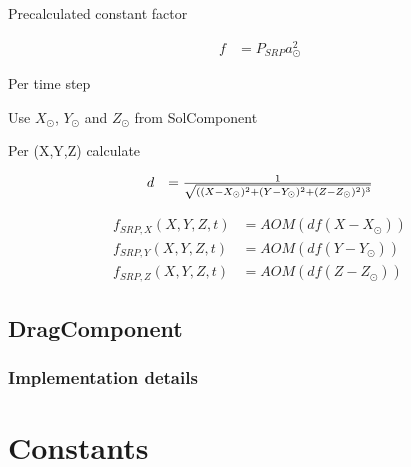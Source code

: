 \documentclass{article}
\begin{document}
Precalculated constant factor

\begin{equation}
\begin{array}{ll}
f &= P_{SRP}a_\odot^2
\end{array}
\end{equation}

Per time step

Use \(X_{\odot}\), \(Y_{\odot}\) and \(Z_{\odot}\) from SolComponent

Per (X,Y,Z) calculate

\begin{equation}
\begin{array}{ll}
d &= {1 \over \sqrt{((X-X_\odot)^2+(Y-Y_\odot)^2+(Z-Z_\odot)^2)^3}}
\end{array}
\end{equation}

\begin{equation}
\begin{array}{ll}
f_{SRP,X}(X,Y,Z,t) &=AOM(df(X-X_{\odot})) \\
f_{SRP,Y}(X,Y,Z,t) &=AOM(df(Y-Y_{\odot})) \\
f_{SRP,Z}(X,Y,Z,t) &=AOM(df(Z-Z_{\odot}))
\end{array}
\end{equation}

\subsection{DragComponent}

\subsubsection{Implementation details}

\section{Constants}
\end{document}
